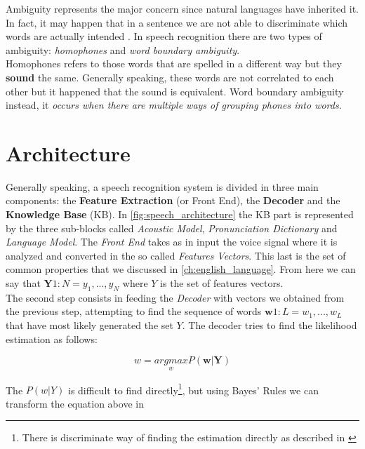 \noindent Ambiguity represents the major concern since natural languages have inherited it. In fact, it may happen that in a sentence we are not able to discriminate which words are actually intended \cite{forsberg2003speech}. In speech recognition there are two types of ambiguity: \textit{homophones} and \textit{word boundary ambiguity}. \\
Homophones refers to those words that are spelled in a different way but they \textbf{sound} the same. Generally speaking, these words are not correlated to each other but it happened that the sound is equivalent. Word boundary ambiguity instead, it \textit{occurs when there are multiple ways of grouping phones into words}\cite{forsberg2003speech}.

\section{Architecture}
\label{sec:speech_rec_Architecture}
Generally speaking, a speech recognition system is divided in three main components: the \textbf{Feature Extraction} (or Front End), the \textbf{Decoder} and the \textbf{Knowledge Base} (KB). In \ref{fig:speech_architecture} the KB part is represented by the three sub-blocks called \textit{Acoustic Model}, \textit{Pronunciation Dictionary} and \textit{Language Model}. The \textit{Front End} takes as in input the voice signal where it is analyzed and converted in the so called \textit{Features Vectors}. This last is the set of common properties that we discussed in \ref{ch:english_language}. From here we can say that $\textbf{Y} 1:N = y_{1},..., y_{N}$ where $Y$ is the set of features vectors. \\
The second step consists in feeding the \textit{Decoder} with vectors we obtained from the previous step, attempting to find the sequence of words $\textbf{w} 1:L = w_{1}, ... , w_{L}$ that have most likely generated the set $Y$\cite{gales2008application}. The decoder tries to find the likelihood estimation as follows:

\begin{equation}
	\widehat{w} = \underset{w}{arg max} P(\textbf{w}| \textbf{Y})
\end{equation} 

\noindent The $P (w|Y)$ is difficult to find directly\footnote{There is discriminate way of finding the estimation directly as described in \cite{gales2007discriminative}}, but using Bayes' Rules we can transform the equation above in

